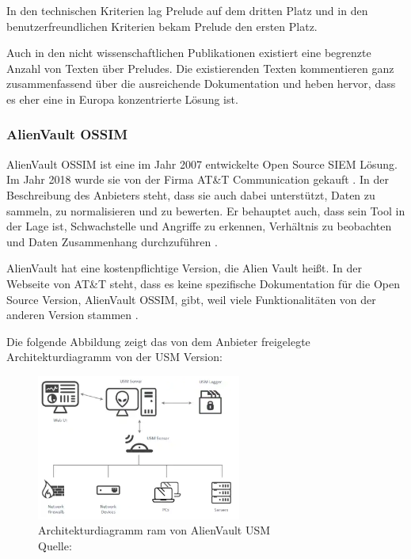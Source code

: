 In den technischen Kriterien lag Prelude auf dem dritten Platz und in den benutzerfreundlichen Kriterien bekam Prelude den ersten Platz. 

Auch in den nicht wissenschaftlichen Publikationen existiert eine begrenzte Anzahl von Texten über Preludes. Die existierenden Texten kommentieren ganz zusammenfassend über die ausreichende Dokumentation und heben hervor, dass es eher eine in Europa konzentrierte Lösung ist.

\subsubsection{AlienVault OSSIM}
AlienVault OSSIM ist eine im Jahr 2007 entwickelte \gls{Open Source} SIEM Lösung. Im Jahr 2018 wurde sie von der Firma AT\&T Communication gekauft \citep{CBN_AV}. In der Beschreibung des Anbieters steht, dass sie auch dabei unterstützt, Daten zu sammeln, zu normalisieren und zu bewerten. Er behauptet auch, dass sein Tool in der Lage ist, Schwachstelle und Angriffe zu erkennen, Verhältnis zu beobachten und Daten Zusammenhang durchzuführen \citep{ATT_AVO}.

AlienVault hat eine kostenpflichtige Version, die Alien Vault  heißt. In der Webseite von AT\&T steht, dass es keine spezifische Dokumentation für die \gls{Open Source} Version, AlienVault OSSIM, gibt, weil viele Funktionalitäten von der anderen Version stammen \citep{ATT_AVO}. 

\newpage
Die folgende Abbildung zeigt das von dem Anbieter freigelegte Architekturdiagramm von der \gls{USM} Version:

\begin{figure}[H]
   \centering
   \includegraphics[width=0.6\textwidth]{assets/2_p6.png}
   \caption{Architekturdiagramm  ram von AlienVault \gls{USM} \\Quelle: \citep{ATT_AVO} }
   \centering
\end{figure}

